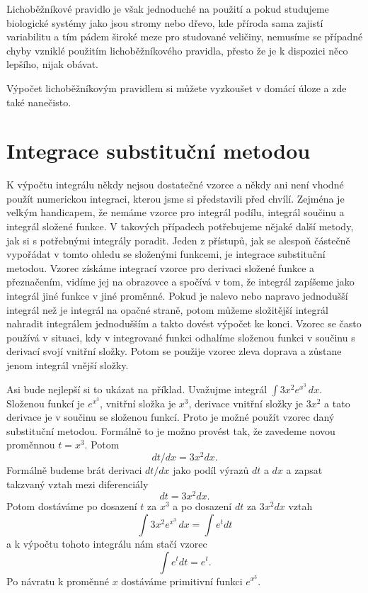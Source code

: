 \documentclass[12pt]{article}
\begin{document}
Lichoběžníkové pravidlo je však jednoduché na použití a pokud studujeme biologické systémy jako jsou stromy nebo dřevo, kde příroda sama zajistí variabilitu a tím pádem široké meze pro studované veličiny, nemusíme se případné chyby vzniklé použitím lichoběžníkového pravidla, přesto že je k dispozici něco lepšího, nijak obávat.

Výpočet lichoběžníkovým pravidlem si můžete vyzkoušet v domácí úloze a zde také nanečisto. 

\section*{Integrace substituční metodou}

K výpočtu integrálu někdy nejsou dostatečné vzorce a někdy ani není vhodné použít numerickou integraci, kterou jsme si představili před chvílí. Zejména je velkým handicapem, že nemáme vzorce pro integrál podílu, integrál součinu a integrál složené funkce. V takových případech potřebujeme nějaké další metody, jak si s potřebnými integrály poradit. Jeden z přístupů, jak se alespoň částečně vypořádat v tomto ohledu se složenými funkcemi, je integrace substituční metodou. Vzorec získáme integrací vzorce pro derivaci složené funkce a přeznačením, vidíme jej na obrazovce a spočívá v tom, že integrál zapíšeme jako integrál jiné funkce v jiné proměnné. Pokud je nalevo nebo napravo jednodušší integrál než je integrál na opačné straně, potom můžeme složitější integrál nahradit integrálem jednodušším a takto dovést výpočet ke konci. Vzorec se často používá v situaci, kdy v integrované funkci odhalíme složenou funkci v součinu s derivací svojí vnitřní složky. Potom se použije vzorec zleva doprava a zůstane jenom integrál vnější složky.

Asi bude nejlepší si to ukázat na příklad. Uvažujme integrál $\int 3x^2 e^{x^3}\,dx$. Složenou funkcí je $e^{x^3}$, vnitřní složka je $x^3$, derivace vnitřní složky je $3x^2$ a tato derivace je v součinu se složenou funkcí. Proto je možné použít vzorec daný substituční metodou. Formálně to je možno provést tak, že zavedeme novou proměnnou $t=x^3$. Potom $$dt/dx=3x^2dx.$$ Formálně budeme brát derivaci $dt/dx$ jako podíl výrazů $dt$ a $dx$ a zapsat takzvaný vztah mezi diferenciály
$$dt=3x^2 dx.$$ Potom dostáváme po dosazení $t$ za $x^3$ a po dosazení $dt$ za $3x^2dx$ vztah
$$\int 3x^2 e^{x^3}\,dx=\int e^t dt$$
a k výpočtu tohoto integrálu nám stačí vzorec
$$\int e^t dt=e^t.$$
Po návratu k proměnné $x$ dostáváme primitivní funkci $e^{x^3}$.
\end{document}
